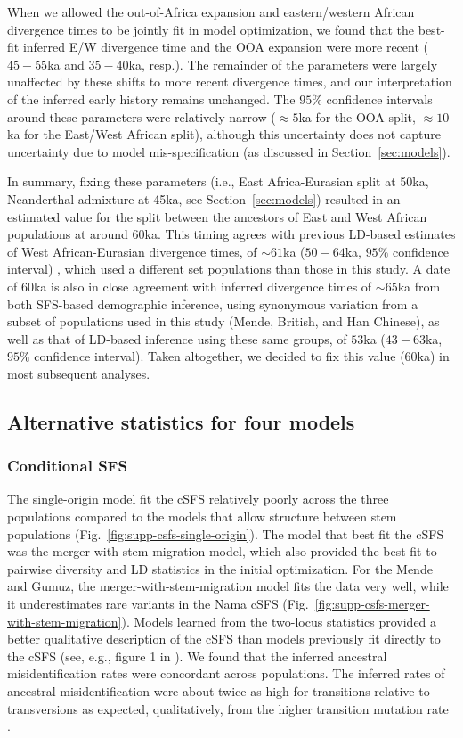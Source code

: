 \documentclass[]{article}
\begin{document}
When we allowed the out-of-Africa expansion and eastern/western African
divergence times to be jointly fit in model optimization, we found that the
best-fit inferred E/W divergence time and the OOA expansion were more recent
($45-55$ka and $35-40$ka, resp.). The remainder of the parameters were largely
unaffected by these shifts to more recent divergence times, and our
interpretation of the inferred early history remains unchanged. The $95\%$
confidence intervals around these parameters were relatively narrow ($\approx
5$ka for the OOA split, $\approx 10$ka for the East/West African split),
although this uncertainty does not capture uncertainty due to model
mis-specification (as discussed in Section~\ref{sec:models}).

In summary, fixing these parameters (i.e., East Africa-Eurasian split at 50ka,
Neanderthal admixture at 45ka, see Section~\ref{sec:models}) resulted in an
estimated value for the split between the ancestors of East and West African
populations at around $60$ka. This timing agrees with previous LD-based
estimates of West African-Eurasian divergence times, of $\sim61$ka ($50-64$ka,
$95\%$ confidence interval) \citep{Ragsdale2019-nt}, which used a different set
populations than those in this study. A date of $60$ka is also in close
agreement with inferred divergence times of $\sim65$ka from both SFS-based
demographic inference, using synonymous variation from a subset of populations
used in this study (Mende, British, and Han Chinese), as well as that of
LD-based inference using these same groups, of $53$ka ($43-63$ka, $95\%$
confidence interval). Taken altogether, we decided to fix this value ($60$ka)
in most subsequent analyses.

\subsection{Alternative statistics for four models}

\subsubsection{Conditional SFS}
\label{sec:cSFS}
The single-origin model fit the cSFS relatively poorly across the three
populations compared to the models that allow structure between stem
populations (Fig.~\ref{fig:supp-csfs-single-origin}). The model that best fit
the cSFS was the merger-with-stem-migration model, which also provided the best
fit to pairwise diversity and LD statistics in the initial optimization. For
the Mende and Gumuz, the merger-with-stem-migration model fits the data very
well, while it underestimates rare variants in the Nama cSFS
(Fig.~\ref{fig:supp-csfs-merger-with-stem-migration}). Models learned from the
two-locus statistics provided a better qualitative description of the cSFS than
models previously fit directly to the cSFS  (see, e.g., figure 1 in
\citet{Durvasula2020-td}). We found that the inferred ancestral
misidentification rates were concordant across populations. The inferred rates
of ancestral misidentification were about twice as high for transitions
relative to transversions as expected, qualitatively, from the higher
transition mutation rate \citep{Hernandez2007-mf}.
\end{document}
